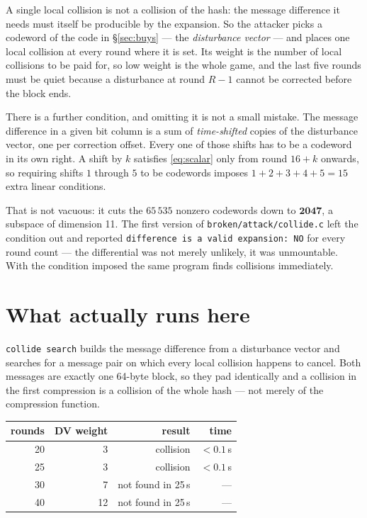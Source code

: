 \documentclass[11pt,a4paper]{article}
\begin{document}
A single local collision is not a collision of the hash: the message
difference it needs must itself be producible by the expansion. So the
attacker picks a codeword of the code in \S\ref{sec:buys} --- the
\emph{disturbance vector} --- and places one local collision at every round
where it is set. Its weight is the number of local collisions to be paid for,
so low weight is the whole game, and the last five rounds must be quiet
because a disturbance at round $R-1$ cannot be corrected before the block
ends.

There is a further condition, and omitting it is not a small mistake. The
message difference in a given bit column is a sum of \emph{time-shifted}
copies of the disturbance vector, one per correction offset. Every one of
those shifts has to be a codeword in its own right. A shift by $k$ satisfies
\eqref{eq:scalar} only from round $16+k$ onwards, so requiring shifts $1$
through $5$ to be codewords imposes $1+2+3+4+5 = 15$ extra linear conditions.

That is not vacuous: it cuts the $65\,535$ nonzero codewords down to
$\mathbf{2047}$, a subspace of dimension 11. The first version of
\texttt{broken/attack/collide.c} left the condition out and reported
\texttt{difference is a valid expansion: NO} for every round count --- the
differential was not merely unlikely, it was unmountable. With the condition
imposed the same program finds collisions immediately.

\section{What actually runs here}\label{sec:runs}

\texttt{collide search} builds the message difference from a disturbance
vector and searches for a message pair on which every local collision happens
to cancel. Both messages are exactly one 64-byte block, so they pad
identically and a collision in the first compression is a collision of the
whole hash --- not merely of the compression function.

\begin{center}
\begin{tabular}{rrrr}
\toprule
rounds & DV weight & result & time \\
\midrule
20 & 3 & collision & $<0.1$\,s \\
25 & 3 & collision & $<0.1$\,s \\
30 & 7 & not found in 25\,s & --- \\
40 & 12 & not found in 25\,s & --- \\
\bottomrule
\end{tabular}
\end{center}
\end{document}
